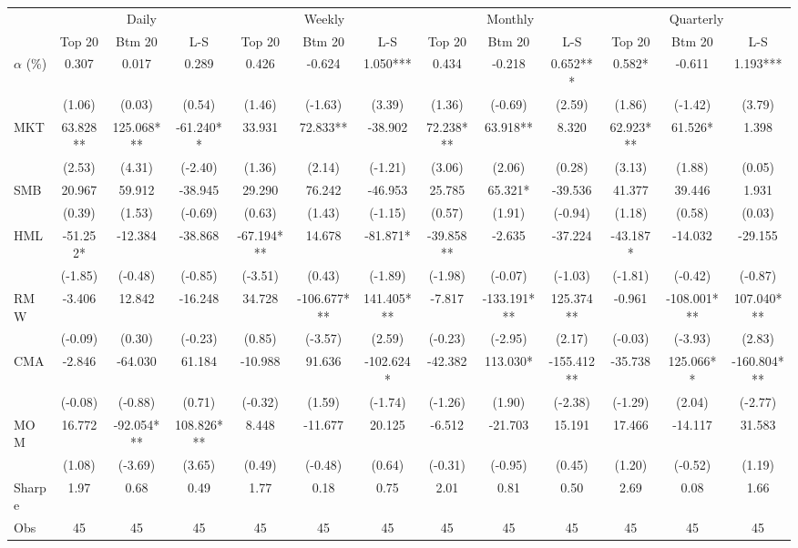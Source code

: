 \begin{tabular}{l*{12}{c}}
\toprule
 & \multicolumn{3}{c}{Daily} & \multicolumn{3}{c}{Weekly} & \multicolumn{3}{c}{Monthly} & \multicolumn{3}{c}{Quarterly} \\
\cmidrule(lr){2-4}\cmidrule(lr){5-7}\cmidrule(lr){8-10}\cmidrule(lr){11-13}
 & Top 20 & Btm 20 & L-S & Top 20 & Btm 20 & L-S & Top 20 & Btm 20 & L-S & Top 20 & Btm 20 & L-S \\
\midrule
$\alpha$ (\%) & 0.307 & 0.017 & 0.289 & 0.426 & -0.624 & 1.050*** & 0.434 & -0.218 & 0.652*** & 0.582* & -0.611 & 1.193*** \\
 & (1.06) & (0.03) & (0.54) & (1.46) & (-1.63) & (3.39) & (1.36) & (-0.69) & (2.59) & (1.86) & (-1.42) & (3.79) \\
MKT & 63.828** & 125.068*** & -61.240** & 33.931 & 72.833** & -38.902 & 72.238*** & 63.918** & 8.320 & 62.923*** & 61.526* & 1.398 \\
 & (2.53) & (4.31) & (-2.40) & (1.36) & (2.14) & (-1.21) & (3.06) & (2.06) & (0.28) & (3.13) & (1.88) & (0.05) \\
SMB & 20.967 & 59.912 & -38.945 & 29.290 & 76.242 & -46.953 & 25.785 & 65.321* & -39.536 & 41.377 & 39.446 & 1.931 \\
 & (0.39) & (1.53) & (-0.69) & (0.63) & (1.43) & (-1.15) & (0.57) & (1.91) & (-0.94) & (1.18) & (0.58) & (0.03) \\
HML & -51.252* & -12.384 & -38.868 & -67.194*** & 14.678 & -81.871* & -39.858** & -2.635 & -37.224 & -43.187* & -14.032 & -29.155 \\
 & (-1.85) & (-0.48) & (-0.85) & (-3.51) & (0.43) & (-1.89) & (-1.98) & (-0.07) & (-1.03) & (-1.81) & (-0.42) & (-0.87) \\
RMW & -3.406 & 12.842 & -16.248 & 34.728 & -106.677*** & 141.405*** & -7.817 & -133.191*** & 125.374** & -0.961 & -108.001*** & 107.040*** \\
 & (-0.09) & (0.30) & (-0.23) & (0.85) & (-3.57) & (2.59) & (-0.23) & (-2.95) & (2.17) & (-0.03) & (-3.93) & (2.83) \\
CMA & -2.846 & -64.030 & 61.184 & -10.988 & 91.636 & -102.624* & -42.382 & 113.030* & -155.412** & -35.738 & 125.066** & -160.804*** \\
 & (-0.08) & (-0.88) & (0.71) & (-0.32) & (1.59) & (-1.74) & (-1.26) & (1.90) & (-2.38) & (-1.29) & (2.04) & (-2.77) \\
MOM & 16.772 & -92.054*** & 108.826*** & 8.448 & -11.677 & 20.125 & -6.512 & -21.703 & 15.191 & 17.466 & -14.117 & 31.583 \\
 & (1.08) & (-3.69) & (3.65) & (0.49) & (-0.48) & (0.64) & (-0.31) & (-0.95) & (0.45) & (1.20) & (-0.52) & (1.19) \\
Sharpe & 1.97 & 0.68 & 0.49 & 1.77 & 0.18 & 0.75 & 2.01 & 0.81 & 0.50 & 2.69 & 0.08 & 1.66 \\
Obs & 45 & 45 & 45 & 45 & 45 & 45 & 45 & 45 & 45 & 45 & 45 & 45 \\
\bottomrule
\end{tabular}
